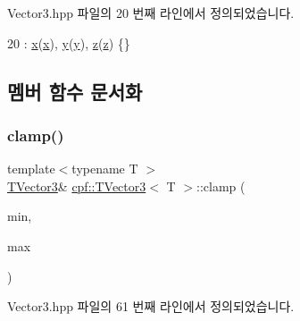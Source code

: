 Vector3.\+hpp 파일의 20 번째 라인에서 정의되었습니다.


\begin{DoxyCode}
20 : \hyperlink{classcpf_1_1_t_vector3_ad3df42808358a64c518d6349ede446d8}{x}(\hyperlink{classcpf_1_1_t_vector3_ad3df42808358a64c518d6349ede446d8}{x}), \hyperlink{classcpf_1_1_t_vector3_a2371a0583e76dcc80c6f10dd168cde1b}{y}(\hyperlink{classcpf_1_1_t_vector3_a2371a0583e76dcc80c6f10dd168cde1b}{y}), \hyperlink{classcpf_1_1_t_vector3_ae7ea5f4b24c3438a44eb6b0fdfe02823}{z}(\hyperlink{classcpf_1_1_t_vector3_ae7ea5f4b24c3438a44eb6b0fdfe02823}{z}) \{\}
\end{DoxyCode}


\subsection{멤버 함수 문서화}
\mbox{\label{classcpf_1_1_t_vector3_a2d169126f33fea892d0c74df1aa7b777}} 
\subsubsection{\texorpdfstring{clamp()}{clamp()}}
{\footnotesize\ttfamily template$<$typename T $>$ \\
\hyperlink{classcpf_1_1_t_vector3}{T\+Vector3}\& \hyperlink{classcpf_1_1_t_vector3}{cpf\+::\+T\+Vector3}$<$ T $>$\+::clamp (\begin{DoxyParamCaption}\item[{\hyperlink{classcpf_1_1_t_vector3}{T\+Vector3}$<$ T $>$}]{min,  }\item[{\hyperlink{classcpf_1_1_t_vector3}{T\+Vector3}$<$ T $>$}]{max }\end{DoxyParamCaption})\hspace{0.3cm}{\ttfamily [inline]}}



Vector3.\+hpp 파일의 61 번째 라인에서 정의되었습니다.


